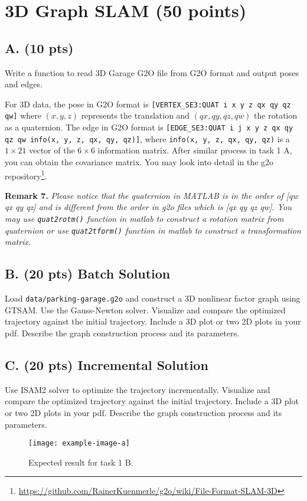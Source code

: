 \documentclass[tp]{lcc}
\begin{document}
\section{3D Graph SLAM (50 points)}
\subsection{A. (10 pts)}
Write a function to read 3D Garage G2O file from G2O format and output poses and edges.

For 3D data, the pose in G2O format is \texttt{[VERTEX\_SE3:QUAT i x y z qx qy qz qw]} where $(x,y,z)$ represents the translation and $(qx,qy,qz,qw)$ the rotation as a quaternion. The edge in G2O format is \texttt{[EDGE\_SE3:QUAT i j x y z qx qy qz qw info(x, y, z, qx, qy, qz)]}, where \texttt{info(x, y, z, qx, qy, qz)} is a $1 \times 21$ vector of the $6 \times 6$ information matrix. After similar process in task 1 A, you can obtain the covariance matrix. You may look into detail in the g2o repository\footnote{\url{https://github.com/RainerKuenmerle/g2o/wiki/File-Format-SLAM-3D}}.

\textbf{Remark 7.} \textit{Please notice that the quaternion in MATLAB is in the order of [qw qx qy qz] and is different from the order in g2o files which is [qx qy qz qw]. You may use \texttt{quat2rotm()} function in matlab to construct a rotation matrix from quaternion or use \texttt{quat2tform()} function in matlab to construct a transformation matrix.}

\subsection{B. (20 pts) Batch Solution}
Load \texttt{data/parking-garage.g2o} and construct a 3D nonlinear factor graph using GTSAM. Use the Gauss-Newton solver. Visualize and compare the optimized trajectory against the initial trajectory. Include a 3D plot or two 2D plots in your pdf. Describe the graph construction process and its parameters.

\subsection{C. (20 pts) Incremental Solution}
Use ISAM2 solver to optimize the trajectory incrementally. Visualize and compare the optimized trajectory against the initial trajectory. Include a 3D plot or two 2D plots in your pdf. Describe the graph construction process and its parameters.

\begin{figure}[h]
    \centering
    \texttt{[image: example-image-a]}
    \caption{Expected result for task 1 B.}
    \label{fig:task1b}
\end{figure}
\end{document}
